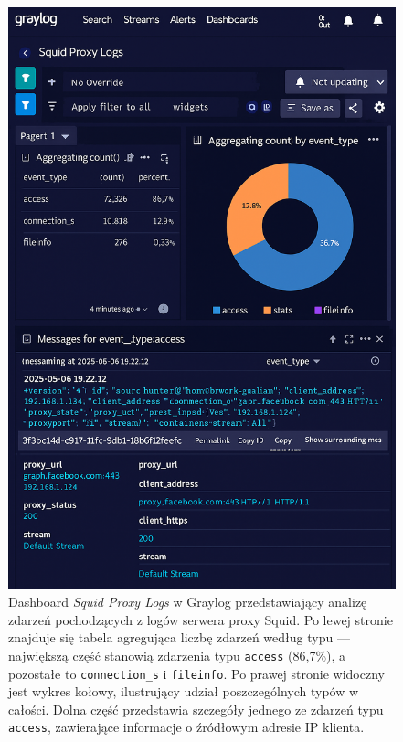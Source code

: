 \documentclass[
    left=2.5cm,         %
    right=2.5cm,        %
    top=2.5cm,          %
    bottom=3cm,         %
    bindingoffset=6mm,  %
    nohyphenation=true %
]{eiti/eiti-thesis} %
\begin{document}
\newpage
\begin{figure}[H]
    \centering
    \includegraphics[width=\textwidth]{img/graylog_proxy.png}
    \caption{Dashboard \textit{Squid Proxy Logs} w Graylog przedstawiający analizę zdarzeń pochodzących z logów serwera proxy Squid. Po lewej stronie znajduje się tabela agregująca liczbę zdarzeń według typu — największą część stanowią zdarzenia typu \texttt{access} (86{,}7\%), a pozostałe to \texttt{connection\_s} i \texttt{fileinfo}. Po prawej stronie widoczny jest wykres kołowy, ilustrujący udział poszczególnych typów w całości. Dolna część przedstawia szczegóły jednego ze zdarzeń typu \texttt{access}, zawierające informacje o źródłowym adresie IP klienta.}
    \label{fig:graylog-squid-logs}
\end{figure}
\end{document}
